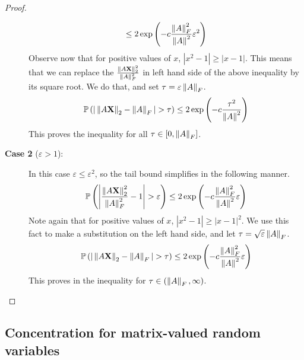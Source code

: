 \documentclass[11pt]{article}
\begin{document}
\begin{proof}
\begin{description}
\begin{align*}
      \leq 2 \exp \left( -c \frac{\left\lVert A\right\rVert_F^2}{\left\lVert A\right\rVert^2} \varepsilon^2 \right)
    \end{align*}
    Observe now that for positive values of $x$, $|x^2-1| \geq |x-1|$. This means that we can replace the $\frac{\left\lVert A \mathbf{X}\right\rVert_2^2}{\left\lVert A\right\rVert_F^2}$ in left hand side of the above inequality by its square root.
    We do that, and set $\tau = \varepsilon \left\lVert A\right\rVert_F$.
    \begin{align*}
      \mathbb{P}\left( |\left\lVert A \mathbf{X}\right\rVert_2 - \left\lVert A\right\rVert_F| > \tau \right)
      \leq 2 \exp \left( -c \frac{\tau^2}{\left\lVert A\right\rVert^2} \right)
    \end{align*}
    This proves the inequality for all $\tau \in \left[ 0, \left\lVert A\right\rVert_F \right]$.
  \item[\textbf{Case 2} ($\varepsilon > 1$):] In this case $\varepsilon \leq \varepsilon^2$, so the tail bound simplifies in the following manner.
    \begin{align*}
    \mathbb{P}\left( \left| \frac{ \left\lVert A \mathbf{X}\right\rVert_2^2}{ \left\lVert A\right\rVert_F^2}  - 1 \right| > \varepsilon \right)
      \leq 2 \exp \left( -c \frac{\left\lVert A\right\rVert_F^2}{\left\lVert A\right\rVert^2} \varepsilon \right)
    \end{align*}
    Note again that for positive values of $x$, $|x^2 - 1| \geq |x-1|^2$. We use this fact to make a substitution on the left hand side, and let $\tau = \sqrt{\varepsilon} \left\lVert A\right\rVert_F$.
    \begin{align*}
      \mathbb{P}\left( |\left\lVert A \mathbf{X}\right\rVert_2 - \left\lVert A\right\rVert_F| > \tau \right)
      \leq 2 \exp  \left( -c \frac{\left\lVert A\right\rVert_F^2}{\left\lVert A\right\rVert^2} \varepsilon \right)
    \end{align*}
    This proves in the inequality for $\tau \in \left( \left\lVert A\right\rVert_F, \infty \right)$.
  \end{description}
\end{proof}

\subsection{Concentration for matrix-valued random variables}
\label{sec:conc-matr-valu}
\end{document}
